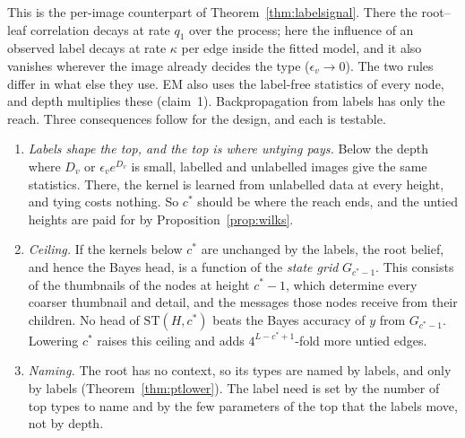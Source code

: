 \documentclass[11pt]{article}
\theoremstyle{definition}
\begin{document}
\noindent This is the per-image counterpart of Theorem~\ref{thm:labelsignal}. There the root--leaf
correlation decays at rate $q_1$ over the process; here the influence of an observed label decays at rate
$\kappa$ per edge inside the fitted model, and it also vanishes wherever the image already decides the type
($\epsilon_v\to0$). The two rules differ in what else they use. EM also uses the label-free statistics of
every node, and depth multiplies these (claim~1). Backpropagation from labels has only the reach. Three
consequences follow for the design, and each is testable.
\begin{enumerate}
\item \emph{Labels shape the top, and the top is where untying pays.} Below the depth where $D_v$ or
$\epsilon_ve^{D_v}$ is small, labelled and unlabelled images give the same statistics. There, the
kernel is learned from unlabelled data at every height, and tying costs nothing. So $c^*$ should be where
the reach ends, and the untied heights are paid for by Proposition~\ref{prop:wilks}.
\item \emph{Ceiling.} If the kernels below $c^*$ are unchanged by the labels, the root belief, and hence the
Bayes head, is a function of the \emph{state grid} $G_{c^*-1}$. This consists of the thumbnails of the nodes
at height $c^*-1$, which determine every coarser thumbnail and detail, and the messages those nodes receive from
their children. No head of $\mathrm{ST}(H,c^*)$ beats the Bayes accuracy of $y$ from $G_{c^*-1}$. Lowering
$c^*$ raises this ceiling and adds $4^{L-c^*+1}$-fold more untied edges.
\item \emph{Naming.} The root has no context, so its types are named by labels, and only by labels
(Theorem~\ref{thm:ptlower}). The label need is set by the number of top types to name and by the few parameters
of the top that the labels move, not by depth.
\end{enumerate}
\end{document}
